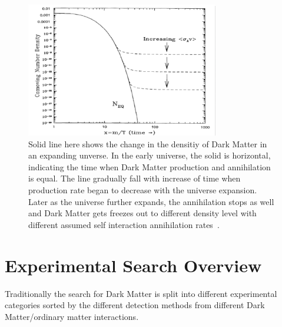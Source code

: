 \begin{figure}[!htb]
    \begin{center}
        \includegraphics[width=0.75\textwidth]{figures/chapter_DM/WIMP}
        \caption{
            Solid line here shows the change in the densitiy of Dark Matter in an expanding unverse. In the early universe, the solid is horizontal, indicating the time when Dark Matter production and annihilation is equal. The line gradually fall with increase of time when production rate began to decrease with the universe expansion. Later as the universe further expands, the annihilation stops as well and Dark Matter gets freezes out to different density level with different assumed self interaction annihilation rates~\cite{WIMP}.
        }
        \label{fig:WIMP_figure}
    \end{center}
\end{figure}


 



\section{Experimental Search Overview}
\label{section:searches}

Traditionally the search for Dark Matter is split into different experimental categories sorted by the different detection methods from different Dark Matter/ordinary matter interactions. 

